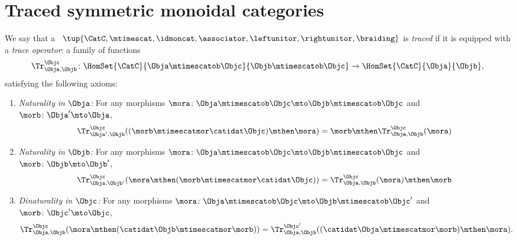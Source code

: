 
\section{Traced symmetric monoidal categories}




\begin{ctdefinition}
    \label{def:traced-monoidal-cat}
    \label{def:traced-monoidal-category}
    We say that a ~$\tup{\CatC, \mtimescat, \idmoncat, \associator, \leftunitor, \rightunitor, \braiding}$ is \emph{traced} if it is equipped with a \emph{trace operator}: a family of functions
    \begin{equation}
        \Tr_{\Obja,\Objb}^\Objc\colon \HomSet{\CatC}{\Obja \mtimescatob \Objc}{\Objb\mtimescatob \Objc}\to \HomSet{\CatC}{\Obja}{\Objb},
    \end{equation}
    satisfying the following axioms:
    \begin{enumerate}
        \item \emph{Naturality in $\Obja$:} For any morphisms $\mora\colon \Obja\mtimescatob \Objc \mto \Objb\mtimescatob \Objc$ and $\morb \colon \Obja' \mto \Obja$,
              \begin{equation}\label{eq:mon-trace-naturality-1}
                  \Tr_{\Obja', \Objb}^\Objc ( (\morb \mtimescatmor \catidat\Objc) \mthen \mora) = \morb \mthen \Tr_{\Obja, \Objb}^\Objc (\mora)
              \end{equation}
        \item \emph{Naturality in $\Objb$:} For any morphisms $\mora\colon \Obja\mtimescatob \Objc \mto \Objb\mtimescatob \Objc$ and $\morb \colon \Objb \mto \Objb'$,
              \begin{equation}\label{eq:mon-trace-naturality-2}
                  \Tr_{\Obja, \Objb'}^\Objc ( \mora \mthen (\morb \mtimescatmor \catidat\Objc) ) = \Tr_{\Obja, \Objb}^\Objc (\mora) \mthen \morb
              \end{equation}
        \item \emph{Dinaturality in $\Objc$:}
              For any morphisms $\mora \colon \Obja  \mtimescatob \Objc \mto \Objb \mtimescatob \Objc'$ and $\morb \colon \Objc' \mto \Objc$,
              \begin{equation}\label{eq:-mon-trace-dinaturality}
                  \Tr_{\Obja, \Objb}^{\Objc} (\mora \mthen (\catidat\Objb \mtimescatmor \morb)) = \Tr_{\Obja, \Objb}^{\Objc'}((\catidat\Obja \mtimescatmor \morb) \mthen \mora).
              \end{equation}


\end{enumerate}
\end{ctdefinition}
